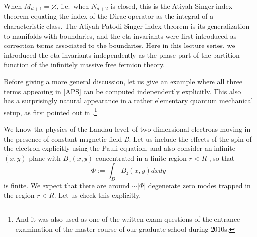 \documentclass[12pt]{article}
\numberwithin{equation}{section}
\numberwithin{figure}{section}
\theoremstyle{remark}
\begin{document}
When $M_{d+1}=\varnothing$, i.e.~when $N_{d+2}$ is closed, this is the Atiyah-Singer index theorem
equating the index of the Dirac operator as the integral of a characteristic class.
The Atiyah-Patodi-Singer index theorem is its generalization to manifolds with boundaries,
and the eta invariants were first introduced as correction terms associated to the boundaries.
Here in this lecture series, we introduced the eta invariants independently
as the phase part of the partition function of the infinitely massive free fermion theory.

Before giving a more general discussion, let us give an example
where all three terms appearing in \eqref{APS} can be computed independently explicitly.
This also has a surprisingly natural appearance in a rather elementary quantum mechanical setup,
as first pointed out in \cite{Aharonov:1978gb}.\footnote{%
And it was also used as one of the written exam questions of the entrance examination 
of the master course  of our graduate school during 2010s.}

We know the physics of the Landau level, of two-dimensional electrons moving in the presence of
constant magnetic field $B$.
Let us include the effects of the spin of the electron explicitly using the Pauli equation,
and also consider an infinite $(x,y)$-plane with $B_z(x,y)$ concentrated in a finite region $r<R$ , so that \begin{equation}
\Phi:=\int_D B_z(x,y) dxdy
\label{PhiFlux}
\end{equation} is finite.
We expect that there are around $\sim |\Phi|$ degenerate zero modes trapped in the region $r<R$.
Let us check this explicitly.
\end{document}
